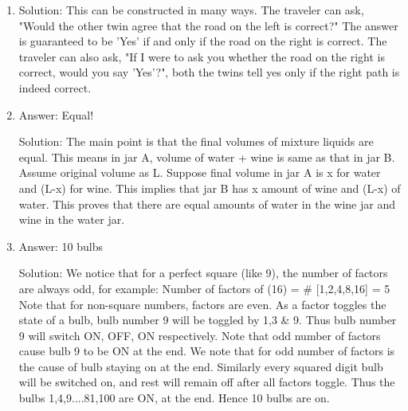 \begin{enumerate}

\item
Solution: This can be constructed in many ways.
The traveler can ask, "Would the other twin agree that the road on the left is correct?" The answer is guaranteed to be 'Yes' if and only if the road on the right is correct.
The traveler can also ask, "If I were to ask you whether the road on the right is correct, would you say 'Yes'?", both the twins tell yes only if the right path is indeed correct.




\item
Answer: Equal!
 
Solution: The main point is that the final volumes of mixture liquids are equal. This means in jar A, volume of water + wine is same as that in jar B. Assume original volume as L. Suppose final volume in jar A is x for water and (L-x) for wine. This implies that jar B has x amount of wine and (L-x) of water. This proves that there are equal amounts of water in the wine jar and wine in the water jar.




\item
Answer: 10 bulbs
 
Solution: We notice that for  a perfect square (like 9), the number of factors are always odd, for example:
Number of factors of (16) = \# [1,2,4,8,16] = 5
Note that for non-square numbers, factors are even.
As a factor toggles the state of a bulb, bulb number 9 will be toggled by 1,3 \& 9.  Thus bulb number 9 will switch ON, OFF, ON respectively. Note that odd number of factors cause bulb 9 to be ON at the end.
We note that for odd number of factors is the cause of bulb staying on at the end. Similarly every squared digit bulb will be switched on, and rest will remain off after all factors toggle. Thus the bulbs 1,4,9....81,100 are ON, at the end. Hence 10 bulbs are on.





\end{enumerate}
